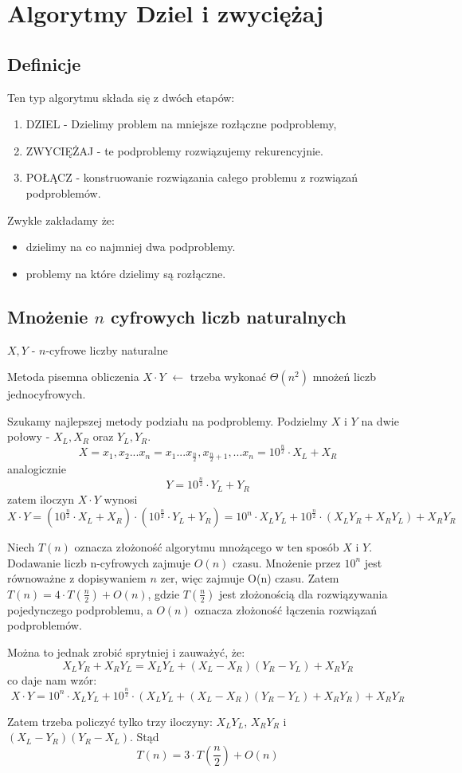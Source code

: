 \section{Algorytmy Dziel i zwyciężaj}
\subsection{Definicje}
Ten typ algorytmu składa się z dwóch etapów:
\begin{enumerate}
	\item DZIEL - Dzielimy problem na mniejsze rozłączne podproblemy, 
	\item ZWYCIĘŻAJ - te podproblemy rozwiązujemy rekurencyjnie.
	\item POŁĄCZ - konstruowanie rozwiązania całego problemu z rozwiązań podproblemów. 
\end{enumerate}

Zwykle zakładamy że:
\begin{itemize}
	\item dzielimy na co najmniej dwa podproblemy.
	\item problemy na które dzielimy są rozłączne.
\end{itemize}

\subsection{Mnożenie $n$ cyfrowych liczb naturalnych}
$X,Y$ - $n$-cyfrowe liczby naturalne

Metoda pisemna obliczenia $X \cdot Y$ $\leftarrow$ trzeba wykonać $\Theta(n^2)$ mnożeń liczb jednocyfrowych.

Szukamy najlepszej metody podziału na podproblemy. Podzielmy $X$ i $Y$ na dwie połowy - $X_L, X_R$ oraz $Y_L, Y_R$.
$$X = x_1,x_2...x_n = x_1...x_{\frac{n}{2}},x_{\frac{n}{2}+1}, ...x_n = 10^\frac{n}{2} \cdot X_L+X_R$$
analogicznie
$$Y = 10^\frac{n}{2} \cdot Y_L+Y_R$$
zatem iloczyn $X \cdot Y$ wynosi
$$X \cdot Y = (10^\frac{n}{2} \cdot X_L + X_R) \cdot (10^\frac{n}{2} \cdot Y_L + Y_R) = 10^n \cdot X_L Y_L + 10^\frac{n}{2} \cdot (X_L Y_R + X_R Y_L) + X_R Y_R $$

Niech $T(n)$ oznacza złożoność algorytmu mnożącego w ten sposób $X$ i $Y$. Dodawanie liczb n-cyfrowych zajmuje $O(n)$ czasu. Mnożenie przez $10^n$ jest równoważne z dopisywaniem $n$ zer, więc zajmuje O(n) czasu. Zatem $T(n) = 4 \cdot T(\frac{n}{2}) + O(n)$, gdzie $T(\frac{n}{2})$ jest złożonością dla rozwiązywania pojedynczego podproblemu, a $O(n)$ oznacza złożoność łączenia rozwiązań podproblemów.

Można to jednak zrobić sprytniej i zauważyć, że:
$$X_L Y_R + X_R Y_L =  X_L Y_L + (X_L - X_R)(Y_R - Y_L) +X_R Y_R$$
co daje nam wzór:
$$X \cdot Y = 10^n \cdot X_L Y_L + 10^\frac{n}{2} \cdot (X_L Y_L+ (X_L - X_R)(Y_R - Y_L) + X_R Y_R) + X_R Y_R $$

Zatem trzeba policzyć tylko trzy iloczyny: $X_L Y_L$, $X_R Y_R$ i $(X_L - Y_R)(Y_R - X_L)$. Stąd
$$T(n) = 3 \cdot T(\frac{n}{2}) + O(n)$$
